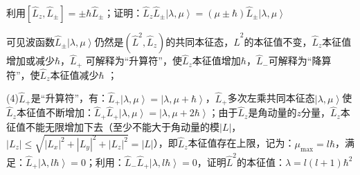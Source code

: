 \begin{itemize}
利用$\left[ {\widehat L_z ,\widehat L_ \pm  } \right] =  \pm \hbar \widehat L_ \pm  $；证明：$\widehat L_z \widehat L_ \pm  \left| {\lambda ,\mu } \right\rangle  = \left( {\mu  \pm \hbar } \right)\widehat L_ \pm  \left| {\lambda ,\mu } \right\rangle $


可见波函数$\widehat L_ \pm  \left| {\lambda ,\mu } \right\rangle $仍然是$\left( {\widehat L^2 ,\widehat L_z } \right)$的共同本征态，$\widehat L^2 $的本征值不变，$\widehat L_z $本征值增加或减少$\hbar$，$\widehat L_ +  $
可解释为``升算符''，使$\widehat L_z $本征值增加$\hbar$，$\widehat L_ -  $可解释为``降算符''，使$\widehat L_z $本征值减少$\hbar$ ；

(4)$\widehat L_ +  $是``升算符''，有：$\widehat L_ +  \left| {\lambda ,\mu } \right\rangle  = \left| {\lambda ,\mu  + \hbar } \right\rangle $，$\widehat L_ +  $多次左乘共同本征态$\left| {\lambda ,\mu } \right\rangle $使$\widehat L_z $本征值不断增加：$\widehat L_ +  \widehat L_ +  \left| {\lambda ,\mu } \right\rangle  = \left| {\lambda ,\mu  + 2\hbar } \right\rangle $；由于$\widehat L_z $是角动量的$z$分量，$\widehat L_z $本征值不能无限增加下去（至少不能大于角动量的模$\left| L \right|$，$\left| {L_z } \right| \le \sqrt {\left| {L_x } \right|^2  + \left| {L_y } \right|^2  + \left| {L_z } \right|^2 }  = \left| L \right|$），即$\widehat L_z $本征值存在上限，记为：$\mu _{\max }  = l\hbar $，满足：$\widehat L_ +  \left| {\lambda ,l\hbar } \right\rangle  = 0$；利用：$\widehat L_ -  \widehat L_ +  \left| {\lambda ,l\hbar } \right\rangle  = 0$，证明$\widehat L^2 $的本征值：$\lambda  = l \left( {l + 1} \right)\hbar ^2 $


\end{itemize}
